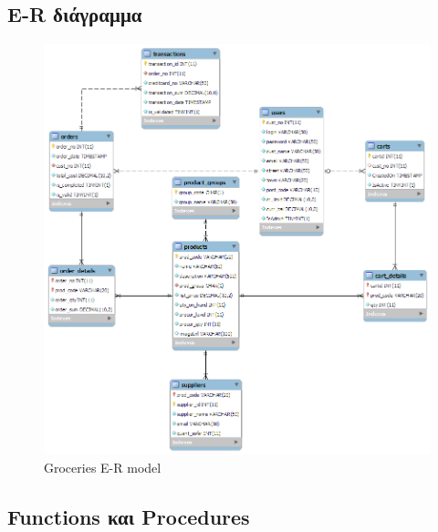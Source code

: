 \documentclass[12pt]{article}
\begin{document}
  	\subsection{E-R διάγραμμα}
		\begin{figure}[H]
			\centering
			\includegraphics[width=1\textwidth]{ER_model}
			\caption{Groceries E-R model}
		\end{figure}
	\pagebreak
	\subsection{Functions και Procedures}
\end{document}
